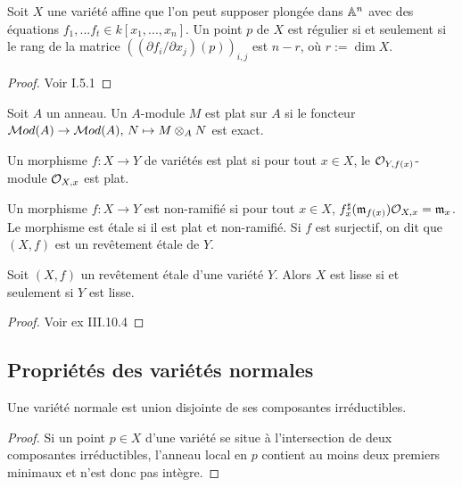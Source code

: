 \begin{prop}\label{CritereReg}
Soit $X$ une variété affine que l'on peut supposer plongée dans $\mathbb{A}^n$ avec des équations $f_1,...f_t\in k[x_1,...,x_n]$. Un point $p$ de $X$ est régulier si et seulement si le rang de la matrice $((\partial f_i/\partial x_j)(p))_{i,j}$ est $n-r$, où $r:=\dim X$.
\end{prop}
\begin{proof}
Voir \cite{Hartshorne} I.5.1
\end{proof}

\begin{defn}
Soit $A$ un anneau. Un  $A$-module $M$ est plat sur $A$ si le foncteur $\mathcal{M} od(A)\rightarrow \mathcal{M} od(A),\, N\mapsto M\otimes_A N$ est exact.
\end{defn}

\begin{defn}
Un morphisme $f:X\rightarrow Y$ de variétés est plat si pour tout $x\in X$, le $\mathcal{O}_{Y,f(x)}$-module $\mathcal{O}_{X,x}$ est plat.
\end{defn}


\begin{defn}
Un morphisme $f:X\rightarrow Y$ est non-ramifié si pour tout $x\in X$, $f^\sharp_x(\mathfrak{m}_{f(x)})\mathcal{O}_{X,x}=\mathfrak{m}_x$. Le morphisme est étale si il est plat et non-ramifié. Si $f$ est surjectif, on dit  que $(X,f)$ est un revêtement étale de $Y$.
\end{defn}


\begin{prop}\label{EtaleLisse}
Soit $(X,f)$ un revêtement étale d'une variété $Y$. Alors $X$ est lisse si et seulement si $Y$ est lisse.
\end{prop}
\begin{proof}
Voir \cite{Hartshorne} ex III.10.4
\end{proof}

\subsection{Propriétés des variétés normales}

\begin{prop}\label{normaluniondisjointe}
Une variété normale est union disjointe de ses composantes irréductibles.
\end{prop}
\begin{proof}
Si un point $p\in X$ d'une variété se situe à l'intersection de deux composantes irréductibles, l'anneau local en $p$ contient au moins deux premiers minimaux et n'est donc pas intègre.
\end{proof}

